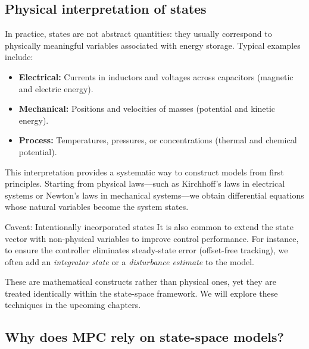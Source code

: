 \subsection*{Physical interpretation of states}

In practice, states are not abstract quantities: they usually correspond to physically meaningful variables associated with energy storage. Typical examples include:
\begin{itemize}
	\item \textbf{Electrical:} Currents in inductors and voltages across capacitors (magnetic and electric energy).
\item \textbf{Mechanical:} Positions and velocities of masses (potential and kinetic energy).
	\item \textbf{Process:} Temperatures, pressures, or concentrations (thermal and chemical potential).
\end{itemize}

This interpretation provides a systematic way to construct models from first principles. Starting from physical laws—such as Kirchhoff’s laws in electrical systems or Newton’s laws in mechanical systems—we obtain differential equations whose natural variables become the system states.

\begin{notebox}{Caveat: Intentionally incorporated states}
	It is also common to extend the state vector with non-physical variables to improve control performance. For instance, to ensure the controller eliminates steady-state error (offset-free tracking), we often add an \emph{integrator state} or a \emph{disturbance estimate} to the model. 
	
	These are mathematical constructs rather than physical ones, yet they are treated identically within the state-space framework. We will explore these techniques in the upcoming chapters.
\end{notebox}

\subsection*{Why does MPC rely on state-space models?}

